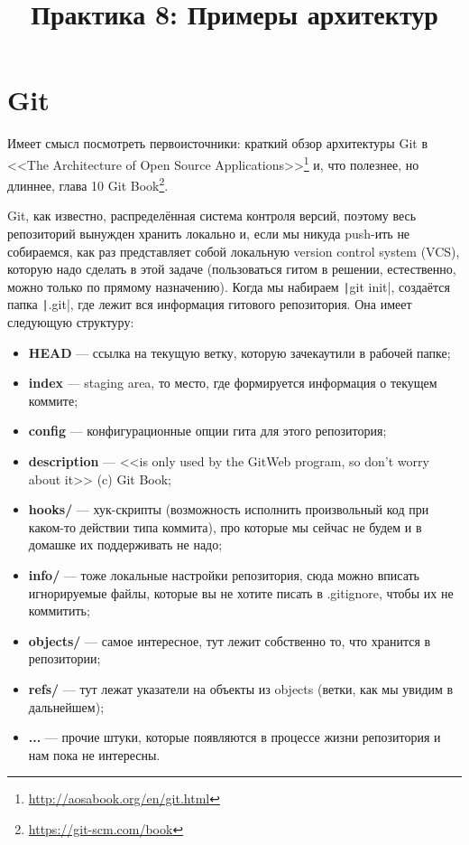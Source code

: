 \documentclass[a5paper]{article}
\title{Практика 8: Примеры архитектур}
\date{}
\begin{document}
\maketitle
\thispagestyle{empty}

\section{Git}

Имеет смысл посмотреть первоисточники: краткий обзор архитектуры Git в <<The Architecture of Open Source Applications>>\footnote{\url{http://aosabook.org/en/git.html}} и, что полезнее, но длиннее, глава 10 Git Book\footnote{\url{https://git-scm.com/book}}. 

Git, как известно, распределённая система контроля версий, поэтому весь репозиторий вынужден хранить локально и, если мы никуда push-ить не собираемся, как раз представляет собой локальную version control system (VCS), которую надо сделать в этой задаче (пользоваться гитом в решении, естественно, можно только по прямому назначению). Когда мы набираем \texttt|git init|, создаётся папка \texttt|.git|, где лежит вся информация гитового репозитория. Она имеет следующую структуру:

\begin{itemize}
	\item \textbf{HEAD} --- ссылка на текущую ветку, которую зачекаутили в рабочей папке;
	\item \textbf{index} --- staging area, то место, где формируется информация о текущем коммите;
	\item \textbf{config} --- конфигурационные опции гита для этого репозитория;
	\item \textbf{description} --- <<is only used by the GitWeb program, so don’t worry about it>> (c) Git Book;
	\item \textbf{hooks/} --- хук-скрипты (возможность исполнить произвольный код при каком-то действии типа коммита), про которые мы сейчас не будем и в домашке их поддерживать не надо;
	\item \textbf{info/} --- тоже локальные настройки репозитория, сюда можно вписать игнорируемые файлы, которые вы не хотите писать в .gitignore, чтобы их не коммитить;
	\item \textbf{objects/} --- самое интересное, тут лежит собственно то, что хранится в репозитории;
	\item \textbf{refs/} --- тут лежат указатели на объекты из objects (ветки, как мы увидим в дальнейшем);
	\item \textbf{...} --- прочие штуки, которые появляются в процессе жизни репозитория и нам пока не интересны.
\end{itemize}
\end{document}
